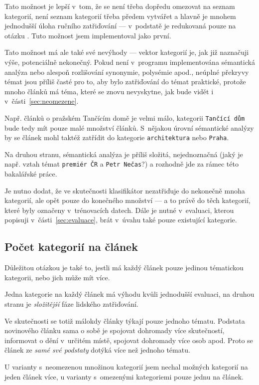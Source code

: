 \documentclass[12pt,a4paper]{report}
\begin{document}
Tato možnost je lepší v~tom, že se není třeba dopředu omezovat na seznam kategorií, není seznam kategorií třeba předem vytvářet a hlavně je mnohem jednodušší úloha ručního zatřiďování --- v~podstatě je redukovaná pouze na otázku . Tuto možnost jsem implementoval jako první.

Tato možnost má ale také své nevýhody --- vektor kategorií je, jak již naznačuji výše, potenciálně nekonečný. Pokud není v~programu implementována sémantická analýza nebo alespoň rozlišování synonymie, polysémie apod., neúplné překryvy témat jsou příliš časté pro to, aby bylo zatřiďování do témat praktické, protože mnoho článků má téma, které se znovu nevyskytne, jak bude vidět i v~části~\ref{sec:neomezene}.

Např. článků o pražském Tančícím domě je velmi málo, kategorii \texttt{Tančící dům} bude tedy mít pouze malé množství článků. S~nějakou úrovní sémantické analýzy by se článek mohl taktéž  zatřídit do kategorie \texttt{architektura} nebo \texttt{Praha}. 

Na druhou stranu, sémantická analýza je příliš složitá, nejednoznačná (jaký je např. vztah témat \texttt{premiér ČR} a \texttt{Petr Nečas}?) a rozhodně jde za rámec této bakalářské práce.

Je nutno dodat, že ve skutečnosti klasifikátor nezatřiďuje do nekonečně mnoha kategorií, ale opět pouze do konečného množství --- a to právě do těch kategorií, které byly označeny v~trénovacích datech. Dále je nutné v~evaluaci, kterou popisuji v~části~\ref{sec:evaluace}, brát v~úvahu také pouze existující kategorie.

\subsection{Počet kategorií na článek} 
Důležitou otázkou je také to, jestli má každý článek pouze jedinou tématickou kategorii, nebo jich může mít více.

Jedna kategorie na každý článek má výhodu kvůli jednodušší evaluaci, na druhou stranu je \emph{složitější} fáze lidského zatřiďování.

Ve skutečnosti se totiž málokdy články týkají pouze jednoho tématu. Podstata novinového článku sama o sobě je spojovat dohromady více skutečností, informovat o dění v~určitém místě, spojovat dohromady více osob apod. Proto se článek ze \emph{samé své podstaty} dotýká více než jednoho tématu. 

U varianty s~neomezenou množinou kategorií jsem nechal možných kategorií na jeden článek více, u varianty s~omezenými kategoriemi pouze jednu na článek.
\end{document}
